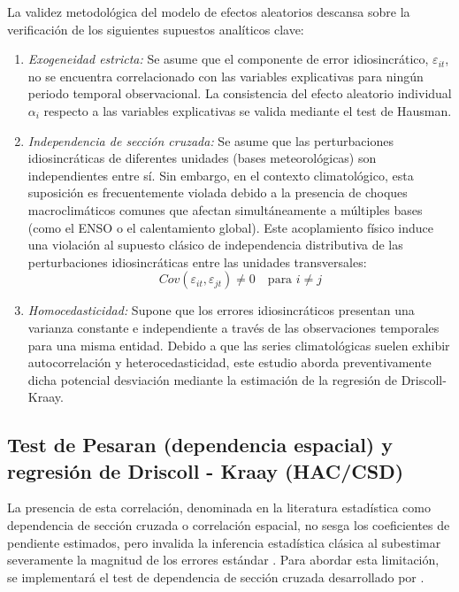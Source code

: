 La validez metodológica del modelo de efectos aleatorios descansa sobre la verificación de los siguientes supuestos analíticos clave:
\begin{enumerate}
    \item \textit{Exogeneidad estricta:} Se asume que el componente de error idiosincrático, $\varepsilon_{it}$, no se encuentra correlacionado con las variables explicativas para ningún periodo temporal observacional. La consistencia del efecto aleatorio individual $\alpha_i$ respecto a las variables explicativas se valida mediante el test de Hausman.
    \item \textit{Independencia de sección cruzada:} Se asume que las perturbaciones idiosincráticas de diferentes unidades (bases meteorológicas) son independientes entre sí. Sin embargo, en el contexto climatológico, esta suposición es frecuentemente violada debido a la presencia de choques macroclimáticos comunes que afectan simultáneamente a múltiples bases (como el ENSO o el calentamiento global). Este acoplamiento físico induce una violación al supuesto clásico de independencia distributiva de las perturbaciones idiosincráticas entre las unidades transversales:
    \begin{equation}
        Cov(\varepsilon_{it}, \varepsilon_{jt}) \neq 0 \quad \text{para } i \neq j
    \end{equation}
    \item \textit{Homocedasticidad:} Supone que los errores idiosincráticos presentan una varianza constante e independiente a través de las observaciones temporales para una misma entidad. 
    Debido a que las series climatológicas suelen exhibir autocorrelación y heterocedasticidad, este estudio aborda preventivamente dicha potencial desviación mediante la estimación de la regresión de Driscoll-Kraay.
\end{enumerate}

\subsection{Test de Pesaran (dependencia espacial) y regresión de Driscoll - Kraay (HAC/CSD)}

La presencia de esta correlación, denominada en la literatura estadística como dependencia de sección cruzada o correlación espacial, no sesga los coeficientes de pendiente estimados, pero invalida la inferencia estadística clásica al subestimar severamente la magnitud de los errores estándar \cite{wooldridge2010}. Para abordar esta limitación, se implementará el test de dependencia de sección cruzada desarrollado por .

